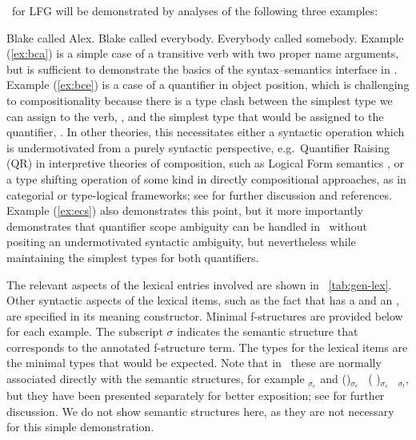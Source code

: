 \glue\ for LFG will be demonstrated by analyses of the following three
examples:
%
\eal

\ex \label{ex:bca} Blake called Alex.
\ex \label{ex:bce} Blake called everybody.
\ex \label{ex:ecs} Everybody called somebody.
\zl
%
Example (\ref{ex:bca}) is a simple case of a transitive verb with two
proper name arguments, but is sufficient to demonstrate the basics of
the syntax--semantics interface in \lfgglue. Example (\ref{ex:bce}) is a
case of a quantifier in object position, which is challenging to
compositionality because there is a type clash between the simplest
type we can assign to the verb, , and the
simplest type that would be assigned to the  quantifier,
. In other theories, this necessitates either
a syntactic operation which is undermotivated from a purely syntactic perspective, e.g.\  
Quantifier Raising (QR)  in interpretive theories of composition, such as Logical Form semantics \citep{may77,May85a-u,HK98a-u},
or a type shifting operation of some kind in directly compositional
approaches, as in categorial or type-logical frameworks; see
\citet[Chapter 14]{jacobson14} for further discussion and references. Example
(\ref{ex:ecs}) also demonstrates this point, but it more importantly
demonstrates that quantifier scope ambiguity can be handled in \glue\
 without positing an undermotivated syntactic ambiguity, but nevertheless  while
maintaining the simplest types for both quantifiers.

The relevant aspects of the lexical entries
involved are shown in \tablew~\ref{tab:gen-lex}.  Other syntactic aspects of the lexical items, such as the fact that  
\word{called} has a \feat{subj} and an , are specified
in its meaning constructor. Minimal f-structures are
provided below for each example. The subscript $\sigma$ indicates the
semantic structure that corresponds to the annotated
f-structure term. The types for the lexical items are the minimal types
that would be expected. Note that in \glue\ these are normally
associated directly with the semantic structures, for example
\Up$_{\sigma{_e}}$ and (\up \feat{obj})$_{\sigma{_e}}$ \linimp\ (\up
\feat{subj})$_{\sigma{_e}}$ \linimp\ \Up$_{\sigma{_t}}$, but they have
been presented separately for better exposition; see
\citet[299--305]{dalrymple;ea19} for further discussion. We do not
show semantic structures here, as they are not necessary for this
simple demonstration. 


